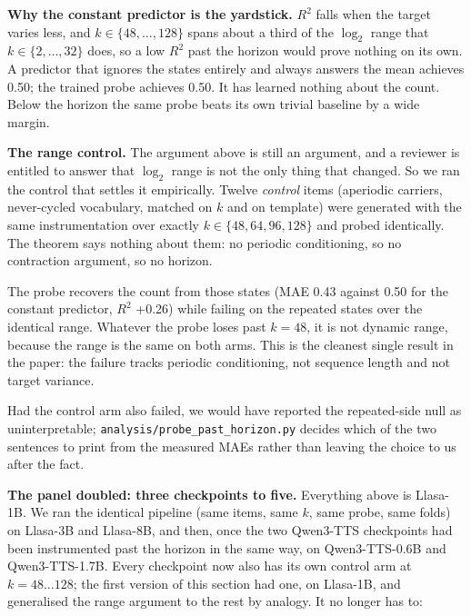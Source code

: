 \documentclass[11pt]{article}
\begin{document}
\noindent\textbf{Why the constant predictor is the yardstick.} $R^2$ falls when
the target varies less, and $k\in\{48,\ldots,128\}$ spans about a third of the
$\log_2$ range that $k\in\{2,\ldots,32\}$ does, so a low $R^2$ past the horizon
would prove nothing on its own. A predictor that ignores the states entirely and
always answers the mean achieves 0.50; the trained probe achieves 0.50. It
has learned nothing about the count. Below the horizon the same probe beats its
own trivial baseline by a wide margin.

\noindent\textbf{The range control.} The argument above is still an argument,
and a reviewer is entitled to answer that $\log_2$ range is not the only thing
that changed. So we ran the control that settles it empirically. Twelve
\emph{control} items (aperiodic carriers, never-cycled vocabulary, matched on
$k$ and on template) were generated with the same instrumentation over exactly
$k\in\{48,64,96,128\}$ and probed identically. The theorem says nothing about
them: no periodic conditioning, so no contraction argument, so no horizon.

The probe recovers the count from those states (MAE 0.43 against 0.50 for the
constant predictor, $R^2$ +0.26) while failing on the repeated states over the
identical range. Whatever the probe loses past $k=48$, it is not dynamic range,
because the range is the same on both arms. This is the cleanest single result in
the paper: the failure tracks periodic conditioning, not sequence length and not
target variance.

Had the control arm also failed, we would have reported the repeated-side null as
uninterpretable; \texttt{analysis/probe\_past\_horizon.py} decides which of the
two sentences to print from the measured MAEs rather than leaving the choice to
us after the fact.

\noindent\textbf{The panel doubled: three checkpoints to five.} Everything above
is Llasa-1B. We ran the identical pipeline (same items, same $k$, same probe,
same folds) on Llasa-3B and Llasa-8B, and then, once the two Qwen3-TTS
checkpoints had been instrumented past the horizon in the same way, on
Qwen3-TTS-0.6B and Qwen3-TTS-1.7B. Every checkpoint now also has its own control
arm at $k=48\ldots128$; the first version of this section had one, on Llasa-1B,
and generalised the range argument to the rest by analogy. It no longer has to:
\end{document}
